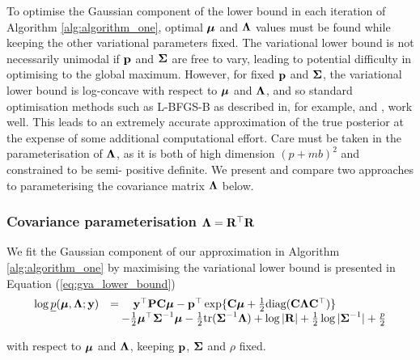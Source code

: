 To optimise the Gaussian component of the lower bound in each iteration of Algorithm \ref{alg:algorithm_one},
optimal ${\boldsymbol \mu}$ and ${\boldsymbol \Lambda}$ values must be found while keeping the other variational parameters fixed. The
variational lower bound is not necessarily unimodal if ${\bf p}$ and ${\boldsymbol \Sigma}$ are free to vary, leading to
potential difficulty in optimising to the global maximum. However, for fixed ${\bf p}$ and ${\boldsymbol \Sigma}$, the
variational lower bound is log-concave with respect to ${\boldsymbol \mu}$ and ${\boldsymbol \Lambda}$, and so standard optimisation
methods such as L-BFGS-B as described in, for example, \cite{Liu1989} and \cite{Nocedal2006}, work well. This
leads to an extremely accurate approximation of the true posterior at the expense of some additional
computational effort. Care must be taken in the parameterisation of ${\boldsymbol \Lambda}$, as it is both of high
dimension $(p + mb)^2$ and constrained to be semi- positive definite. We present and compare two approaches to
parameterising the covariance matrix ${\boldsymbol \Lambda}$ below.
	
\subsubsection{Covariance parameterisation ${\boldsymbol \Lambda} = {\bf R}^\top {\bf R}$}

We fit the Gaussian component of our approximation in Algorithm \ref{alg:algorithm_one} by maximising  the
variational lower bound is presented in Equation (\ref{eq:gva_lower_bound})
\begin{equation}
\label{eq:gva_lower_bound}
\begin{array}{ll}
	\log \underline{p}({\boldsymbol \mu}, {\boldsymbol \Lambda}; {\bf y}) & = \quad {\bf y}^\top{\bf P} {\bf C} {\boldsymbol\mu} - {\bf p}^\top \exp\{{\bf C} {\boldsymbol \mu} + \tfrac{1}{2} \text{diag}({\bf C} {\boldsymbol \Lambda} {\bf C}^\top)\} \\
	& \quad - \tfrac{1}{2} {\boldsymbol \mu}^\top {\boldsymbol\Sigma}^{-1} {\boldsymbol \mu} - \tfrac{1}{2} \text{tr}{({\boldsymbol\Sigma}^{-1} {\boldsymbol\Lambda})} + \log{|{\bf R}|}
	                                        + \tfrac{1}{2} \log{|{\boldsymbol\Sigma}^{-1}|}  + \tfrac{p}{2}
\end{array}
\end{equation}

\noindent with respect to ${\boldsymbol \mu}$ and ${\boldsymbol \Lambda}$, keeping ${\bf p}$, ${\boldsymbol \Sigma}$ and $\rho$ fixed.
		
